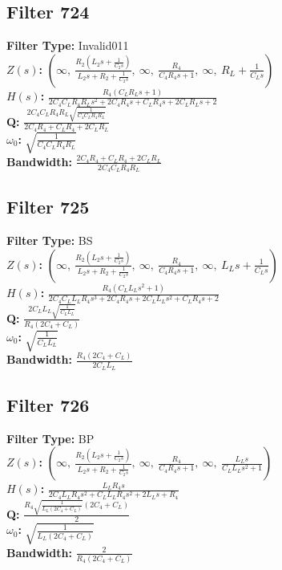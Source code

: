 \documentclass{article}
\begin{document}
\subsection*{Filter 724}
\textbf{Filter Type:} Invalid011 \\ 
\textbf{$Z(s)$:} $\left( \infty, \  \frac{R_{2} \left(L_{2} s + \frac{1}{C_{2} s}\right)}{L_{2} s + R_{2} + \frac{1}{C_{2} s}}, \  \infty, \  \frac{R_{4}}{C_{4} R_{4} s + 1}, \  \infty, \  R_{L} + \frac{1}{C_{L} s}\right)$ \\ 
\textbf{$H(s)$:} $\frac{R_{4} \left(C_{L} R_{L} s + 1\right)}{2 C_{4} C_{L} R_{4} R_{L} s^{2} + 2 C_{4} R_{4} s + C_{L} R_{4} s + 2 C_{L} R_{L} s + 2}$ \\ 
\textbf{Q:} $\frac{2 C_{4} C_{L} R_{4} R_{L} \sqrt{\frac{1}{C_{4} C_{L} R_{4} R_{L}}}}{2 C_{4} R_{4} + C_{L} R_{4} + 2 C_{L} R_{L}}$ \\ 
\textbf{$\omega_0$:} $\sqrt{\frac{1}{C_{4} C_{L} R_{4} R_{L}}}$ \\ 
\textbf{Bandwidth:} $\frac{2 C_{4} R_{4} + C_{L} R_{4} + 2 C_{L} R_{L}}{2 C_{4} C_{L} R_{4} R_{L}}$ \\ 
\subsection*{Filter 725}
\textbf{Filter Type:} BS \\ 
\textbf{$Z(s)$:} $\left( \infty, \  \frac{R_{2} \left(L_{2} s + \frac{1}{C_{2} s}\right)}{L_{2} s + R_{2} + \frac{1}{C_{2} s}}, \  \infty, \  \frac{R_{4}}{C_{4} R_{4} s + 1}, \  \infty, \  L_{L} s + \frac{1}{C_{L} s}\right)$ \\ 
\textbf{$H(s)$:} $\frac{R_{4} \left(C_{L} L_{L} s^{2} + 1\right)}{2 C_{4} C_{L} L_{L} R_{4} s^{3} + 2 C_{4} R_{4} s + 2 C_{L} L_{L} s^{2} + C_{L} R_{4} s + 2}$ \\ 
\textbf{Q:} $\frac{2 C_{L} L_{L} \sqrt{\frac{1}{C_{L} L_{L}}}}{R_{4} \left(2 C_{4} + C_{L}\right)}$ \\ 
\textbf{$\omega_0$:} $\sqrt{\frac{1}{C_{L} L_{L}}}$ \\ 
\textbf{Bandwidth:} $\frac{R_{4} \left(2 C_{4} + C_{L}\right)}{2 C_{L} L_{L}}$ \\ 
\subsection*{Filter 726}
\textbf{Filter Type:} BP \\ 
\textbf{$Z(s)$:} $\left( \infty, \  \frac{R_{2} \left(L_{2} s + \frac{1}{C_{2} s}\right)}{L_{2} s + R_{2} + \frac{1}{C_{2} s}}, \  \infty, \  \frac{R_{4}}{C_{4} R_{4} s + 1}, \  \infty, \  \frac{L_{L} s}{C_{L} L_{L} s^{2} + 1}\right)$ \\ 
\textbf{$H(s)$:} $\frac{L_{L} R_{4} s}{2 C_{4} L_{L} R_{4} s^{2} + C_{L} L_{L} R_{4} s^{2} + 2 L_{L} s + R_{4}}$ \\ 
\textbf{Q:} $\frac{R_{4} \sqrt{\frac{1}{L_{L} \left(2 C_{4} + C_{L}\right)}} \left(2 C_{4} + C_{L}\right)}{2}$ \\ 
\textbf{$\omega_0$:} $\sqrt{\frac{1}{L_{L} \left(2 C_{4} + C_{L}\right)}}$ \\ 
\textbf{Bandwidth:} $\frac{2}{R_{4} \left(2 C_{4} + C_{L}\right)}$ \\ 
\end{document}
